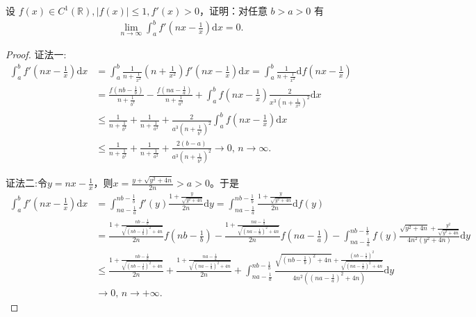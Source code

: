 \documentclass[../../main.tex]{subfiles}%
\begin{document}
\begin{example}
设 $f(x) \in C^1(\mathbb{R}), |f(x)| \leqslant  1, f'(x) > 0$，证明：对任意 $b > a > 0$ 有
\begin{align*}
\lim_{n\rightarrow \infty} \int_a^b{f' \left( nx-\frac{1}{x} \right) \mathrm{d}x}=0.
\end{align*}
\end{example}
\begin{proof}

{\color{blue}证法一:}\begin{align*}
\int_a^b f'\left(nx - \frac{1}{x}\right) \mathrm{d}x &= \int_a^b \frac{1}{n + \frac{1}{x^2}} \left(n + \frac{1}{x^2}\right) f'\left(nx - \frac{1}{x}\right) \mathrm{d}x = \int_a^b \frac{1}{n + \frac{1}{x^2}} \mathrm{d}f\left(nx - \frac{1}{x}\right) \\
&= \frac{f\left(nb - \frac{1}{b}\right)}{n + \frac{1}{b^2}} - \frac{f\left(na - \frac{1}{a}\right)}{n + \frac{1}{a^2}} + \int_a^b f\left(nx - \frac{1}{x}\right) \frac{2}{x^3 \left(n + \frac{1}{x^2}\right)^2} \mathrm{d}x \\
&\leqslant  \frac{1}{n + \frac{1}{b^2}} + \frac{1}{n + \frac{1}{a^2}} + \frac{2}{a^3 \left(n + \frac{1}{b^2}\right)^2} \int_a^b f\left(nx - \frac{1}{x}\right) \mathrm{d}x \\
&\leqslant  \frac{1}{n + \frac{1}{b^2}} + \frac{1}{n + \frac{1}{a^2}} + \frac{2(b - a)}{a^3 \left(n + \frac{1}{b^2}\right)^2} \rightarrow 0, \, n \rightarrow \infty.
\end{align*}

{\color{blue}证法二:}令$y = nx - \frac{1}{x}$，则$x = \frac{y + \sqrt{y^2 + 4n}}{2n} >a> 0$。于是
\begin{align*}
\int_a^b f'\left(nx - \frac{1}{x}\right) \mathrm{d}x &= \int_{na - \frac{1}{a}}^{nb - \frac{1}{b}} f'(y) \frac{1 + \frac{y}{\sqrt{y^2 + 4n}}}{2n} \mathrm{d}y = \int_{na - \frac{1}{a}}^{nb - \frac{1}{b}} \frac{1 + \frac{y}{\sqrt{y^2 + 4n}}}{2n} \mathrm{d}f(y) \\
&= \frac{1 + \frac{nb - \frac{1}{b}}{\sqrt{\left(nb - \frac{1}{b}\right)^2 + 4n}}}{2n} f\left(nb - \frac{1}{b}\right) - \frac{1 + \frac{na - \frac{1}{a}}{\sqrt{\left(na - \frac{1}{a}\right)^2 + 4n}}}{2n} f\left(na - \frac{1}{a}\right) - \int_{na - \frac{1}{a}}^{nb - \frac{1}{b}} f(y) \frac{\sqrt{y^2 + 4n} + \frac{y^2}{\sqrt{y^2 + 4n}}}{4n^2(y^2 + 4n)} \mathrm{d}y \\
&\leqslant  \frac{1 + \frac{nb - \frac{1}{b}}{\sqrt{\left(nb - \frac{1}{b}\right)^2 + 4n}}}{2n} + \frac{1 + \frac{na - \frac{1}{a}}{\sqrt{\left(na - \frac{1}{a}\right)^2 + 4n}}}{2n} + \int_{na - \frac{1}{a}}^{nb - \frac{1}{b}} \frac{\sqrt{\left(nb - \frac{1}{b}\right)^2 + 4n} + \frac{\left(nb - \frac{1}{b}\right)^2}{\sqrt{\left(na - \frac{1}{a}\right)^2 + 4n}}}{4n^2\left(\left(na - \frac{1}{a}\right)^2 + 4n\right)} \mathrm{d}y \\
&\rightarrow 0, \, n \rightarrow +\infty.
\end{align*}
\end{proof}
\end{document}
